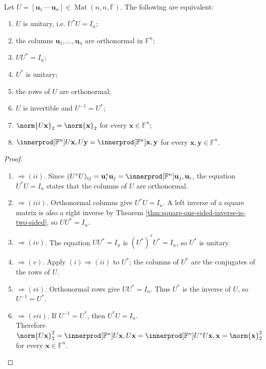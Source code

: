\begin{theorem} \label{thm:unitary-matrix-equivalent-conditions} \\
Let $U=[\mathbf{u}_1\ \cdots\ \mathbf{u}_n]\in\operatorname{Mat}(n,n,\mathbb{F})$. The following are equivalent:
\begin{enumerate}[label=\roman*.]
\setlength{\itemsep}{0pt}
\item $U$ is unitary, i.e. $U^*U=I_n$;
\item the columns $\mathbf{u}_1,\ldots,\mathbf{u}_n$ are orthonormal in $\mathbb{F}^n$;
\item $UU^*=I_n$;
\item $U^*$ is unitary;
\item the rows of $U$ are orthonormal;
\item $U$ is invertible and $U^{-1}=U^*$;
\item $\norm{U\mathbf{x}}_2=\norm{\mathbf{x}}_2$ for every $\mathbf{x}\in\mathbb{F}^n$;
\item $\innerprod[\mathbb{F}^n]{U\mathbf{x},U\mathbf{y}}=\innerprod[\mathbb{F}^n]{\mathbf{x},\mathbf{y}}$ for every $\mathbf{x},\mathbf{y}\in\mathbb{F}^n$.
\end{enumerate}
\begin{proof}
\begin{enumerate}[label=(\roman*).]
\setlength{\itemsep}{0pt}
\item[$(i)$]$\Rightarrow (ii)$. Since $(U^*U)_{ij}=\mathbf{u}_i^*\mathbf{u}_j=\innerprod[\mathbb{F}^n]{\mathbf{u}_j,\mathbf{u}_i}$, the equation $U^*U=I_n$ states that the columns of $U$ are orthonormal.
\item[$(ii)$]$\Rightarrow (iii)$. Orthonormal columns give $U^*U=I_n$. A left inverse of a square matrix is also a right inverse by Theorem \ref{thm:square-one-sided-inverse-is-two-sided}, so $UU^*=I_n$.
\item[$(iii)$]$\Rightarrow (iv)$. The equation $UU^*=I_n$ is $(U^*)^*U^*=I_n$, so $U^*$ is unitary.
\item[$(iv)$]$\Rightarrow (v)$. Apply $(i)\Rightarrow(ii)$ to $U^*$; the columns of $U^*$ are the conjugates of the rows of $U$.
\item[$(v)$]$\Rightarrow (vi)$. Orthonormal rows give $UU^*=I_n$. Thus $U^*$ is the inverse of $U$, so $U^{-1}=U^*$.
\item[$(vi)$]$\Rightarrow (vii)$. If $U^{-1}=U^*$, then $U^*U=I_n$.\\
Therefore $\norm{U\mathbf{x}}_2^2 =\innerprod[\mathbb{F}^n]{U\mathbf{x},U\mathbf{x}} =\innerprod[\mathbb{F}^n]{U^*U\mathbf{x},\mathbf{x}} =\norm{\mathbf{x}}_2^2$ for every $\mathbf{x}\in\mathbb{F}^n$.

\end{enumerate}
\end{proof}
\end{theorem}

